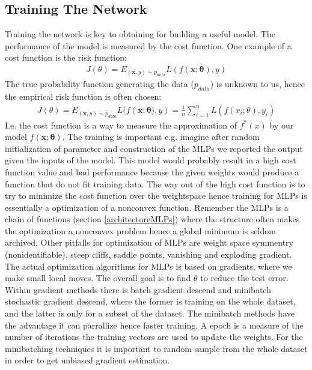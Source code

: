 \subsection{Training The Network}\label{trainNetwork}
Training the network is key to obtaining for building a useful model. The performance of the model is measured by the cost function. One example of a cost function is the risk function:
\begin{align*}
J(\theta)=E_{(\bm{x},y)\sim p_{data}} L(f(\bm{x};\bm{\theta}),y)
\end{align*}
The true probability function generating the data ($p_{data}$) is unknown to us, hence the empirical risk function is often chosen:
\begin{align*}
J(\theta)=E_{(\bm{x},y)\sim \hat{p}_{data}} L(f(\bm{x};\bm{\theta)},y)= \frac{1}{n}\sum_{i=1}^{n} L(f(x_i;\theta),y_i)
\end{align*}
I.e. the cost function is a way to measure the approximation of $f^*(x)$ by our model $f(\bm{x};\bm{\theta})$. The training is important e.g. imagine after random initialization of parameter and construction of the MLPs we reported the output given the inputs of the model. This model would probably result in a high cost function value and bad performance because the given weights would produce a function that do not fit training data. The way out of the high cost function is to try to minimize the cost function over the weightspace hence training for MLPs is essentially a optimization of a nonconvex function. Remember the MLPs is a chain of functions (section \ref{architectureMLPs}) where the structure often makes the optimization a nonconvex problem hence a global minimum is seldom archived. Other pitfalls for optimization of MLPs are weight space symmentry (nonidentifiable), steep cliffs, saddle points, vanishing and exploding gradient.\\

The actual optimization algorithms for MLPs is based on gradients, where we make small local moves. The overall goal is to find $\theta$ to reduce the test error. Within gradient methods there is batch gradient descend and minibatch stochastic gradient descend, where the former is training on the whole dataset, and the latter is only for a subset of the dataset. The minibatch methods have the advantage it can parrallize hence faster training. A epoch is a measure of the number of iterations the training vectors are used to update the weights. For the minibatching techniques it is important to random sample from the whole dataset in order to get unbiased gradient estimation. \\

